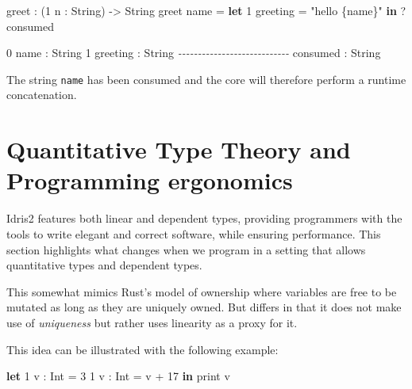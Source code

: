\documentclass[
]{article}
\newenvironment{Shaded}{}{}
\newcommand{\CommentTok}[1]{\textcolor[rgb]{0.38,0.63,0.69}{\textit{#1}}}
\newcommand{\DataTypeTok}[1]{\textcolor[rgb]{0.56,0.13,0.00}{#1}}
\newcommand{\DecValTok}[1]{\textcolor[rgb]{0.25,0.63,0.44}{#1}}
\newcommand{\FunctionTok}[1]{\textcolor[rgb]{0.02,0.16,0.49}{#1}}
\newcommand{\KeywordTok}[1]{\textcolor[rgb]{0.00,0.44,0.13}{\textbf{#1}}}
\newcommand{\NormalTok}[1]{#1}
\newcommand{\OperatorTok}[1]{\textcolor[rgb]{0.40,0.40,0.40}{#1}}
\newcommand{\OtherTok}[1]{\textcolor[rgb]{0.00,0.44,0.13}{#1}}
\newcommand{\StringTok}[1]{\textcolor[rgb]{0.25,0.44,0.63}{#1}}
\begin{document}
\begin{Shaded}
\begin{Highlighting}[]
\NormalTok{greet }\OperatorTok{:}\NormalTok{ (}\DecValTok{1}\NormalTok{ n }\OperatorTok{:} \DataTypeTok{String}\NormalTok{) }\OtherTok{{-}\textgreater{}} \DataTypeTok{String}
\NormalTok{greet name }\OtherTok{=} \KeywordTok{let} \DecValTok{1}\NormalTok{ greeting }\OtherTok{=} \StringTok{"hello \{name\}"} \KeywordTok{in} \OperatorTok{?}\NormalTok{consumed}
\end{Highlighting}
\end{Shaded}

\begin{Shaded}
\begin{Highlighting}[]
\DecValTok{0}\NormalTok{ name }\OperatorTok{:} \DataTypeTok{String}
\DecValTok{1}\NormalTok{ greeting }\OperatorTok{:} \DataTypeTok{String}
\CommentTok{{-}{-}{-}{-}{-}{-}{-}{-}{-}{-}{-}{-}{-}{-}{-}{-}{-}{-}{-}{-}{-}{-}{-}{-}{-}{-}{-}{-}}
\NormalTok{consumed }\OperatorTok{:} \DataTypeTok{String}
\end{Highlighting}
\end{Shaded}

The string \texttt{name} has been consumed and the core will therefore
perform a runtime concatenation.

\newpage

\hypertarget{quantitative-type-theory-and-programming-ergonomics}{%
\section{Quantitative Type Theory and Programming
ergonomics}\label{quantitative-type-theory-and-programming-ergonomics}}

Idris2 features both linear and dependent types, providing programmers
with the tools to write elegant and correct software\cite{tdd}, while
ensuring performance. This section highlights what changes when we
program in a setting that allows quantitative types and dependent types.

This somewhat mimics Rust's \cite{rust} model of ownership where
variables are free to be mutated as long as they are uniquely owned. But
differs in that it does not make use of \emph{uniqueness} but rather
uses linearity as a proxy for it.

This idea can be illustrated with the following example:

\begin{Shaded}
\begin{Highlighting}[]
\KeywordTok{let} \DecValTok{1}\NormalTok{ v }\OtherTok{:} \DataTypeTok{Int} \FunctionTok{=} \DecValTok{3}
    \DecValTok{1}\NormalTok{ v\textquotesingle{} }\OtherTok{:} \DataTypeTok{Int} \FunctionTok{=}\NormalTok{ v }\FunctionTok{+} \DecValTok{17}
 \KeywordTok{in}\NormalTok{ print v\textquotesingle{}}
\end{Highlighting}
\end{Shaded}
\end{document}
